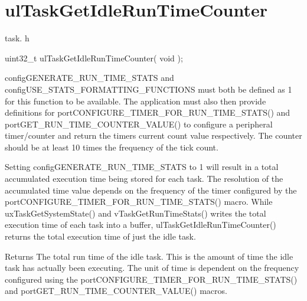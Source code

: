 \hypertarget{group__ul_task_get_idle_run_time_counter}{}\section{ul\+Task\+Get\+Idle\+Run\+Time\+Counter}
\label{group__ul_task_get_idle_run_time_counter}
task. h 
\begin{DoxyPre}uint32\_t ulTaskGetIdleRunTimeCounter( void );\end{DoxyPre}


config\+G\+E\+N\+E\+R\+A\+T\+E\+\_\+\+R\+U\+N\+\_\+\+T\+I\+M\+E\+\_\+\+S\+T\+A\+TS and config\+U\+S\+E\+\_\+\+S\+T\+A\+T\+S\+\_\+\+F\+O\+R\+M\+A\+T\+T\+I\+N\+G\+\_\+\+F\+U\+N\+C\+T\+I\+O\+NS must both be defined as 1 for this function to be available. The application must also then provide definitions for port\+C\+O\+N\+F\+I\+G\+U\+R\+E\+\_\+\+T\+I\+M\+E\+R\+\_\+\+F\+O\+R\+\_\+\+R\+U\+N\+\_\+\+T\+I\+M\+E\+\_\+\+S\+T\+A\+T\+S() and port\+G\+E\+T\+\_\+\+R\+U\+N\+\_\+\+T\+I\+M\+E\+\_\+\+C\+O\+U\+N\+T\+E\+R\+\_\+\+V\+A\+L\+U\+E() to configure a peripheral timer/counter and return the timers current count value respectively. The counter should be at least 10 times the frequency of the tick count.

Setting config\+G\+E\+N\+E\+R\+A\+T\+E\+\_\+\+R\+U\+N\+\_\+\+T\+I\+M\+E\+\_\+\+S\+T\+A\+TS to 1 will result in a total accumulated execution time being stored for each task. The resolution of the accumulated time value depends on the frequency of the timer configured by the port\+C\+O\+N\+F\+I\+G\+U\+R\+E\+\_\+\+T\+I\+M\+E\+R\+\_\+\+F\+O\+R\+\_\+\+R\+U\+N\+\_\+\+T\+I\+M\+E\+\_\+\+S\+T\+A\+T\+S() macro. While ux\+Task\+Get\+System\+State() and v\+Task\+Get\+Run\+Time\+Stats() writes the total execution time of each task into a buffer, ul\+Task\+Get\+Idle\+Run\+Time\+Counter() returns the total execution time of just the idle task.

\begin{DoxyReturn}{Returns}
The total run time of the idle task. This is the amount of time the idle task has actually been executing. The unit of time is dependent on the frequency configured using the port\+C\+O\+N\+F\+I\+G\+U\+R\+E\+\_\+\+T\+I\+M\+E\+R\+\_\+\+F\+O\+R\+\_\+\+R\+U\+N\+\_\+\+T\+I\+M\+E\+\_\+\+S\+T\+A\+T\+S() and port\+G\+E\+T\+\_\+\+R\+U\+N\+\_\+\+T\+I\+M\+E\+\_\+\+C\+O\+U\+N\+T\+E\+R\+\_\+\+V\+A\+L\+U\+E() macros. 
\end{DoxyReturn}
